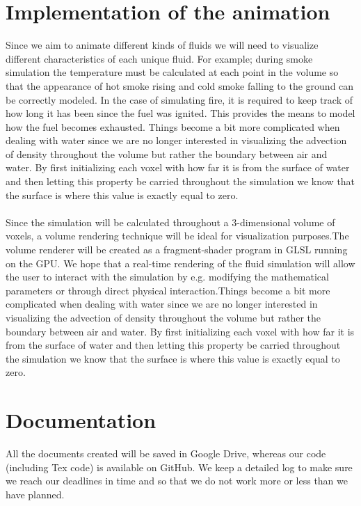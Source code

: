 \documentclass[a4paper,12pt,twoside,swedish]{report}
\begin{document}
\section{Implementation of the animation}
Since we aim to animate different kinds of fluids we will need to visualize different characteristics of each unique fluid.
For example; during smoke simulation the temperature must be calculated at each point in the volume so that the appearance of hot smoke rising and cold smoke falling to the ground can be correctly modeled. In the case of simulating fire, it is required to keep track of how long it has been since the fuel was ignited. This provides the means to model how the fuel becomes exhausted. Things become a bit more complicated when dealing with water since we are no longer interested in visualizing the advection of density throughout the volume but rather the boundary between air and water. By first initializing each voxel with how far it is from the surface of water and then letting this property be carried throughout the simulation we know that the surface is where this value is exactly equal to zero.\\\\
Since the simulation will be calculated throughout a 3-dimensional volume of voxels, a volume rendering technique will be ideal for visualization purposes.The volume renderer will be created as a fragment-shader program   in GLSL running on the GPU.
 We hope that a real-time rendering of the fluid simulation will allow the user to interact with the simulation by e.g. modifying the mathematical parameters or through direct physical interaction.Things become a bit more complicated when dealing with water since we are no longer interested in visualizing the advection of density throughout the volume but rather the boundary between air and water. By first initializing each voxel with how far it is from the surface of water and then letting this property be carried throughout the simulation we know that the surface is where this value is exactly equal to zero.

\section{Documentation}
All the documents created will be saved in Google Drive, whereas our code (including Tex code) is available on GitHub.
We keep a detailed log to make sure we reach our deadlines in time and so that we do not work more or less than we have planned.
\end{document}
